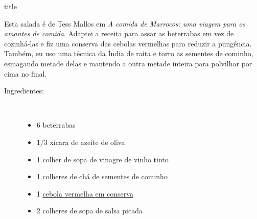 \documentclass [11pt, papel de carta] {article}
\begin{document}
 {title}

Esta salada é de Tess Mallos em {\it A comida de Marrocos: uma viagem para os amantes de comida}. Adaptei a receita para assar as beterrabas em vez de cozinhá-las e fiz uma conserva das cebolas vermelhas para reduzir a pungência. Também, eu uso uma técnica da Índia de raita e torro as sementes de cominho, esmagando metade delas e mantendo a outra metade inteira para polvilhar por cima no final.

\begin {description}

\item [Ingredientes:] \ \\
\begin {itemize}
\item 6 beterrabas
\item 1/3 xícara de azeite de oliva
\item 1 colher de sopa de vinagre de vinho tinto
\item 1 colheres de chá de sementes de cominho
\item 1 \href {PickledRedOnions.html} {cebola vermelha em conserva}
\item 2 colheres de sopa de salsa picada
\end {itemize}



\end{description}
\end{document}
